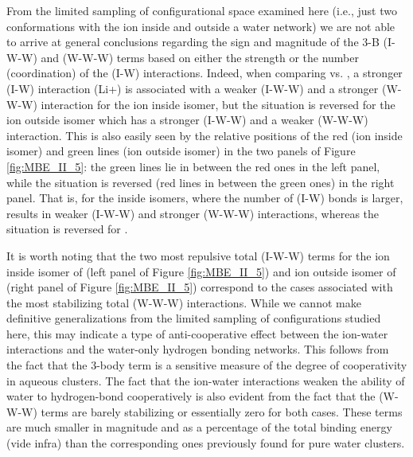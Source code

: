 \documentclass[11pt, proquest]{uwthesis}[2020/02/24]
\let\ce\ch
\begin{document}


\par From the limited sampling of configurational space examined here (i.e., just two conformations with the ion inside and outside a water network) we are not able to arrive at general conclusions regarding the sign and magnitude of the 3-B (I-W-W) and (W-W-W) terms based on either the strength or the number (coordination) of the (I-W) interactions. Indeed, when comparing \ce{Li^+} vs. \ce{Cl^-}, a stronger (I-W) interaction (Li+) is associated with a weaker (I-W-W) and a stronger (W-W-W) interaction for the ion inside isomer, but the situation is reversed for the ion outside isomer which has a stronger (I-W-W) and a weaker (W-W-W) interaction. This is also easily seen by the relative positions of the red (ion inside isomer) and green lines (ion outside isomer) in the two panels of Figure \ref{fig:MBE_II_5}: the green lines lie in between the red ones in the left panel, while the situation is reversed (red lines in between the green ones) in the right panel. That is, for the inside isomers, where the number of (I-W) bonds is larger, \ce{Li^+} results in weaker (I-W-W) and stronger (W-W-W) interactions, whereas the situation is reversed for \ce{Cl^-}.

\par It is worth noting that the two most repulsive total (I-W-W) terms for the ion inside isomer of \ce{Li^+(H2O)9} (left panel of Figure \ref{fig:MBE_II_5}) and ion outside isomer of \ce{Cl^-(H2O)9} (right panel of Figure \ref{fig:MBE_II_5}) correspond to the cases associated with the most stabilizing total (W-W-W) interactions. While we cannot make definitive generalizations from the limited sampling of configurations studied here, this may indicate a type of anti-cooperative effect between the ion-water interactions and the water-only hydrogen bonding networks. This follows from the fact that the 3-body term is a sensitive measure of the degree of cooperativity in aqueous clusters.\autocite{xantheas_cooperativity_2000} The fact that the ion-water interactions weaken the ability of water to hydrogen-bond cooperatively\autocite{xantheas_cooperativity_2000} is also evident from the fact that the (W-W-W) terms are barely stabilizing or essentially zero for both cases. These terms are much smaller in magnitude and as a percentage of the total binding energy (vide infra) than the corresponding ones previously found for pure water clusters.\autocite{heindel_many-body_2020}
\end{document}
